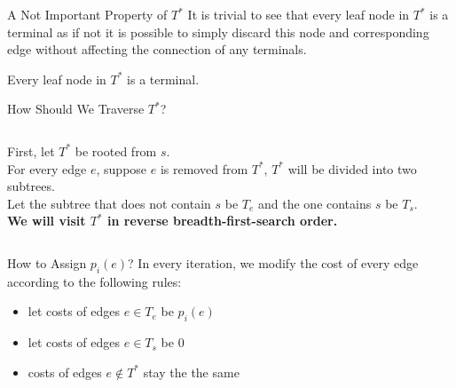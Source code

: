 \documentclass[11pt,aspectratio=169]{beamer}
\begin{document}
\begin{frame}{A Not Important Property of $T^*$}
    It is trivial to see that every leaf node in \(T^*\) is a terminal as if not it is possible to simply discard this node and corresponding edge without affecting the connection of any terminals.
    \vspace{10pt}
\begin{fact}
	Every leaf node in \(T^*\) is a terminal. 
\end{fact}
\end{frame}

\begin{frame}{How Should We Traverse $T^*$?}
\begin{columns}
    First, let \(T^*\) be rooted from \(s\). \\
    \vspace{10pt}
    For every edge \(e\), suppose \(e\) is removed from \(T^*\), \(T^*\) will be divided into two subtrees.\\
    \vspace{10pt}
    Let the subtree that does not contain \(s\) be \(T_e\) and the one contains \(s\) be \(T_s\).\\
    \vspace{10pt}
    \textbf{We will visit \(T^*\) in reverse breadth-first-search order.\\}
\end{columns}
\end{frame}

\begin{frame}{How to Assign \(p_i(e)\)?}
In every iteration, we modify the cost of every edge according to the following rules:
\begin{itemize}
	\item let costs of edges \(e \in T_e\) be \(p_i(e)\)
	\item let costs of edges \(e \in T_s\) be  0
	\item costs of edges \(e\notin T^*\) stay the the same
\end{itemize}
\vspace{10pt}
\end{frame}
\end{document}
